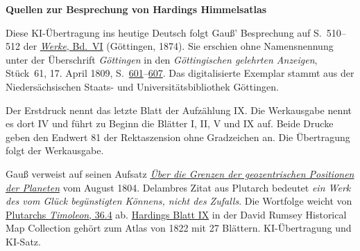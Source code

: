 \clearpage\thispagestyle{empty}
\begin{center}\textbf{Quellen zur Besprechung von Hardings Himmelsatlas}\end{center}
\noindent Diese KI-Übertragung ins heutige Deutsch folgt Gauß’ Besprechung auf S.~510--512 der \href{https://gdz.sub.uni-goettingen.de/id/PPN236007467}{\textit{Werke}, Bd.~VI} (Göttingen, 1874). Sie erschien ohne Namensnennung unter der Überschrift \emph{Göttingen} in den \textit{Göttingischen gelehrten Anzeigen}, Stück~61, 17. April 1809, S.~\href{https://images.p.sub.uni-goettingen.de/iiif/image/gdz:PPN319721507_1809:00000603/full/1750,/0/default.jpg}{601}--\href{https://images.p.sub.uni-goettingen.de/iiif/image/gdz:PPN319721507_1809:00000609/full/1750,/0/default.jpg}{607}. Das digitalisierte Exemplar stammt aus der Niedersächsischen Staats- und Universitätsbibliothek Göttingen.
\par\smallskip\noindent Der Erstdruck nennt das letzte Blatt der Aufzählung IX. Die Werkausgabe nennt es dort IV und führt zu Beginn die Blätter I, II, V und IX auf. Beide Drucke geben den Endwert 81 der Rektaszension ohne Gradzeichen an. Die Übertragung folgt der Werkausgabe.
\par\smallskip\noindent Gauß verweist auf seinen Aufsatz \hyperlink{grenzen1804.1}{\emph{Über die Grenzen der geozentrischen Positionen der Planeten}} vom August 1804. Delambres Zitat aus Plutarch bedeutet \emph{ein Werk des vom Glück begünstigten Könnens, nicht des Zufalls}. Die Wortfolge weicht von \href{https://penelope.uchicago.edu/Thayer/E/Roman/Texts/Plutarch/Lives/Timoleon*.html#36.4}{Plutarchs \textit{Timoleon}, 36.4} ab. \href{https://www.davidrumsey.com/luna/servlet/detail/RUMSEY~8~1~372247~90138986:IX-Atlas-novus-coelestis-XXVII-tabu}{Hardings Blatt IX} in der David Rumsey Historical Map Collection gehört zum Atlas von 1822 mit 27 Blättern. KI-Übertragung und KI-Satz.
\clearpage
